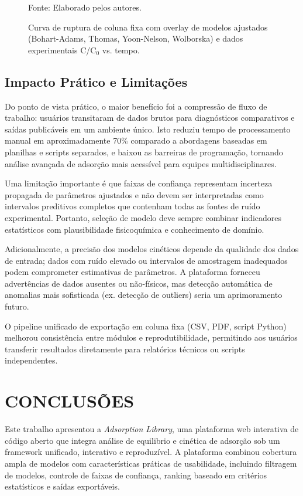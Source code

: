 \documentclass[openany, a4paper, twoside]{article}
\begin{document}
\begin{figure}[h!]
	\centering
	\caption{Curva de ruptura de coluna fixa com overlay de modelos ajustados (Bohart-Adams, Thomas, Yoon-Nelson, Wolborska) e dados experimentais C/C$_0$ vs. tempo.}
	Fonte: Elaborado pelos autores.
	\label{fig:fixed_bed_breakthrough}
\end{figure}

\subsection{Impacto Prático e Limitações}

Do ponto de vista prático, o maior benefício foi a compressão de fluxo de trabalho: usuários transitaram de dados brutos para diagnósticos comparativos e saídas publicáveis em um ambiente único. Isto reduziu tempo de processamento manual em aproximadamente 70\% comparado a abordagens baseadas em planilhas e scripts separados, e baixou as barreiras de programação, tornando análise avançada de adsorção mais acessível para equipes multidisciplinares.

Uma limitação importante é que faixas de confiança representam incerteza propagada de parâmetros ajustados e não devem ser interpretadas como intervalos preditivos completos que contenham todas as fontes de ruído experimental. Portanto, seleção de modelo deve sempre combinar indicadores estatísticos com plausibilidade fisicoquímica e conhecimento de domínio.

Adicionalmente, a precisão dos modelos cinéticos depende da qualidade dos dados de entrada; dados com ruído elevado ou intervalos de amostragem inadequados podem comprometer estimativas de parâmetros. A plataforma forneceu advertências de dados ausentes ou não-físicos, mas detecção automática de anomalias mais sofisticada (ex. detecção de outliers) seria um aprimoramento futuro.

O pipeline unificado de exportação em coluna fixa (CSV, PDF, script Python) melhorou consistência entre módulos e reprodutibilidade, permitindo aos usuários transferir resultados diretamente para relatórios técnicos ou scripts independentes.

\section{CONCLUSÕES}

Este trabalho apresentou a \textit{Adsorption Library}, uma plataforma web interativa de código aberto que integra análise de equilibrio e cinética de adsorção sob um framework unificado, interativo e reproduzível. A plataforma combinou cobertura ampla de modelos com características práticas de usabilidade, incluindo filtragem de modelos, controle de faixas de confiança, ranking baseado em critérios estatísticos e saídas exportáveis.
\end{document}
